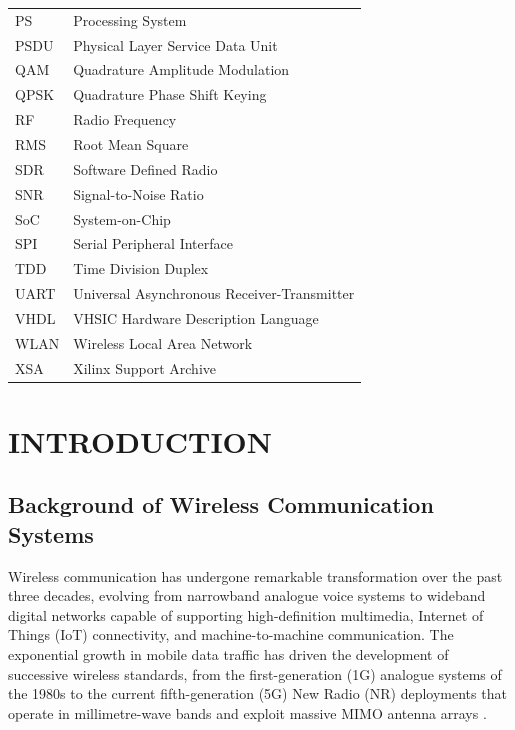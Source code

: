 \documentclass[12pt, a4paper, oneside]{report}
\begin{document}
\begin{longtable}{p{3cm} p{10cm}}
  PS    & Processing System \\
  PSDU  & Physical Layer Service Data Unit \\
  QAM   & Quadrature Amplitude Modulation \\
  QPSK  & Quadrature Phase Shift Keying \\
  RF    & Radio Frequency \\
  RMS   & Root Mean Square \\
  SDR   & Software Defined Radio \\
  SNR   & Signal-to-Noise Ratio \\
  SoC   & System-on-Chip \\
  SPI   & Serial Peripheral Interface \\
  TDD   & Time Division Duplex \\
  UART  & Universal Asynchronous Receiver-Transmitter \\
  VHDL  & VHSIC Hardware Description Language \\
  WLAN  & Wireless Local Area Network \\
  XSA   & Xilinx Support Archive \\
  \bottomrule
\end{longtable}

\setcounter{page}{1}

\chapter{INTRODUCTION}

\section{Background of Wireless Communication Systems}

Wireless communication has undergone remarkable transformation over the past three decades, evolving from narrowband analogue voice systems to wideband digital networks capable of supporting high-definition multimedia, Internet of Things (IoT) connectivity, and machine-to-machine communication. The exponential growth in mobile data traffic has driven the development of successive wireless standards, from the first-generation (1G) analogue systems of the 1980s to the current fifth-generation (5G) New Radio (NR) deployments that operate in millimetre-wave bands and exploit massive MIMO antenna arrays \cite{goldsmith2005wireless}.
\end{document}

